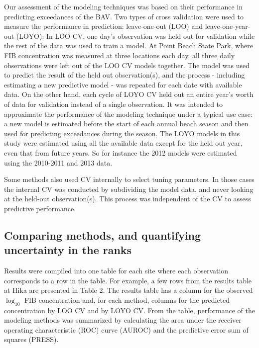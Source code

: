 \documentclass[authoryear,review, 12pt]{elsarticle}
\begin{document}
Our assessment of the modeling techniques was based on their performance
in predicting exceedances of the BAV. Two types of cross validation were
used to measure the performance in prediction: leave-one-out (LOO) and
leave-one-year-out (LOYO). In LOO CV, one day's observation was held out
for validation while the rest of the data was used to train a model. At
Point Beach State Park, where FIB concentration was measured at three
locations each day, all three daily observations were left out of the
LOO CV models together. The model was used to predict the result of the
held out observation(s), and the process - including estimating a new
predictive model - was repeated for each date with available data. On
the other hand, each cycle of LOYO CV held out an entire year's worth of
data for validation instead of a single observation. It was intended to
approximate the performance of the modeling technique under a typical
use case: a new model is estimated before the start of each annual beach
season and then used for predicting exceedances during the season. The
LOYO models in this study were estimated using all the available data
except for the held out year, even that from future years. So for
instance the 2012 models were estimated using the 2010-2011 and 2013
data.

Some methods also used CV internally to select tuning parameters. In
those cases the internal CV was conducted by subdividing the model data,
and never looking at the held-out observation(s). This process was
independent of the CV to assess predictive performance.

\subsection{Comparing methods, and quantifying uncertainty in the
ranks}\label{comparing-methods-and-quantifying-uncertainty-in-the-ranks}

Results were compiled into one table for each site where each
observation corresponds to a row in the table. For example, a few rows
from the results table at Hika are presented in Table 2. The results
table has a column for the observed \(\log_{10}\) FIB concentration and,
for each method, columns for the predicted concentration by LOO CV and
by LOYO CV. From the table, performance of the modeling methods was
summarized by calculating the area under the receiver operating
characteristic (ROC) curve (AUROC) and the predictive error sum of
squares (PRESS).
\end{document}
